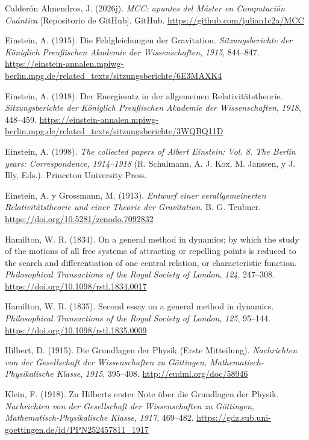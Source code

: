 \documentclass[11pt,a4paper,spanish]{book}
\newlength{\cslhangindent}
\newenvironment{CSLReferences}[2]
 {\begin{list}{}{%
  \setlength{\itemindent}{0pt}
  \setlength{\leftmargin}{0pt}
  \setlength{\parsep}{0pt}
  \ifodd #1
   \setlength{\leftmargin}{\cslhangindent}
   \setlength{\itemindent}{-1\cslhangindent}
  \fi
  \setlength{\itemsep}{#2\baselineskip}}%
  \raggedright
  \renewcommand{\bibitem}[2][]{\item}}
 {\end{list}}
\begin{document}
\begin{CSLReferences}{1}{0}
\bibitem[\citeproctext]{ref-calderon2026mcc}
Calderón Almendros, J. (2026j). \emph{{MCC}: apuntes del {Máster} en
{Computación} {Cuántica}} {[}Repositorio de GitHub{]}. GitHub.
\url{https://github.com/julian1c2a/MCC}

\bibitem[\citeproctext]{ref-einstein1915}
Einstein, A. (1915). Die {Feldgleichungen} der {Gravitation}.
\emph{Sitzungsberichte der Königlich Preußischen Akademie der
Wissenschaften}, \emph{1915}, 844--847.
\url{https://einstein-annalen.mpiwg-berlin.mpg.de/related_texts/sitzungsberichte/6E3MAXK4}

\bibitem[\citeproctext]{ref-einstein1918}
Einstein, A. (1918). Der {Energiesatz} in der allgemeinen
{Relativitätstheorie}. \emph{Sitzungsberichte der Königlich Preußischen
Akademie der Wissenschaften}, \emph{1918}, 448--459.
\url{https://einstein-annalen.mpiwg-berlin.mpg.de/related_texts/sitzungsberichte/3WQBQ11D}

\bibitem[\citeproctext]{ref-einstein1998}
Einstein, A. (1998). \emph{The collected papers of {Albert Einstein}:
Vol. 8. The {Berlin} years: Correspondence, 1914--1918} (R. Schulmann,
A. J. Kox, M. Janssen, y J. Illy, Eds.). Princeton University Press.

\bibitem[\citeproctext]{ref-einsteingrossmann1913}
Einstein, A. y Grossmann, M. (1913). \emph{Entwurf einer
verallgemeinerten {Relativitätstheorie} und einer {Theorie} der
{Gravitation}}. B. G. Teubner.
\url{https://doi.org/10.5281/zenodo.7092832}

\bibitem[\citeproctext]{ref-hamilton1834}
Hamilton, W. R. (1834). On a general method in dynamics; by which the
study of the motions of all free systems of attracting or repelling
points is reduced to the search and differentiation of one central
relation, or characteristic function. \emph{Philosophical Transactions
of the Royal Society of London}, \emph{124}, 247--308.
\url{https://doi.org/10.1098/rstl.1834.0017}

\bibitem[\citeproctext]{ref-hamilton1835}
Hamilton, W. R. (1835). Second essay on a general method in dynamics.
\emph{Philosophical Transactions of the Royal Society of London},
\emph{125}, 95--144. \url{https://doi.org/10.1098/rstl.1835.0009}

\bibitem[\citeproctext]{ref-hilbert1915}
Hilbert, D. (1915). Die {Grundlagen} der {Physik} ({Erste}
{Mitteilung}). \emph{Nachrichten von der Gesellschaft der Wissenschaften
zu Göttingen, Mathematisch-Physikalische Klasse}, \emph{1915}, 395--408.
\url{http://eudml.org/doc/58946}

\bibitem[\citeproctext]{ref-klein1918a}
Klein, F. (1918). Zu {Hilberts} erster {Note} über die {Grundlagen} der
{Physik}. \emph{Nachrichten von der Gesellschaft der Wissenschaften zu
Göttingen, Mathematisch-Physikalische Klasse}, \emph{1917}, 469--482.
\url{https://gdz.sub.uni-goettingen.de/id/PPN252457811_1917}


\end{CSLReferences}
\end{document}
